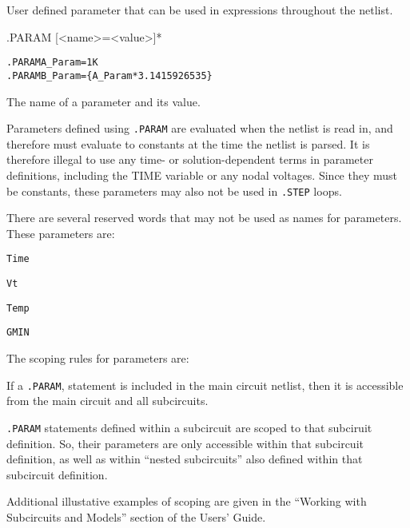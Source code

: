 



User defined parameter that can be used in expressions throughout the netlist.

\begin{Command}

\format
.PARAM [<name>=<value>]*

\examples
\begin{alltt}
.PARAM A_Param=1K
.PARAM B_Param=\{A_Param*3.1415926535\}
\end{alltt}

\arguments

\begin{Arguments}

The name of a parameter and its value.
\medskip

\end{Arguments}

\comments
Parameters defined using \verb+.PARAM+ are evaluated when the netlist is read in, and therefore must evaluate to constants at the time the netlist is parsed.  It is therefore illegal to use any time- or solution-dependent terms in parameter definitions, including the TIME variable or any nodal voltages.   Since they must be constants, these parameters may also not be used in \texttt{.STEP} loops.

There are several reserved words that may not be used as names for parameters.  These parameters are:
\begin{XyceItemize}
\item \verb+Time+ 
\item \verb+Vt+
\item \verb+Temp+
\item \verb+GMIN+
\end{XyceItemize}

The scoping rules for parameters are:
\begin{XyceItemize}
\item If a \texttt{.PARAM}, statement is included in the main circuit 
netlist, then it is accessible from the main circuit and all subcircuits. 
\item \texttt{.PARAM} statements defined within a subcircuit are scoped 
to that subciruit definition.  So, their parameters are only accessible within 
that subcircuit definition, as well as within ``nested subcircuits'' also 
defined within that subcircuit definition.
\end{XyceItemize}

Additional illustative examples of scoping are given in the
``Working with Subcircuits and Models'' section of the \Xyce{} Users' 
Guide\UsersGuide. 

\end{Command}


